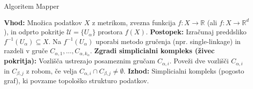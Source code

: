 \begin{algorithm}
\caption{Algoritem Mapper}\label{alg:mapper}
\begin{algorithmic}[1]
\State \textbf{Vhod:} Množica podatkov $X$ z metrikom, 
    zvezna funkcija $f: X \rightarrow \mathbb{R}$ (ali $f: X \rightarrow \mathbb{R}^d$), 
    in odprto pokritje $\mathcal{U} = \{U_\alpha\}$ prostora $f(X)$.
\State \textbf{Postopek:}
    \State Izračunaj preddsliko $f^{-1}(U_\alpha) \subseteq X$.
    \State Na $f^{-1}(U_\alpha)$ uporabi metodo gručenja (npr. single-linkage) in razdeli v gruče $C_{\alpha,1}, \ldots, C_{\alpha,k_\alpha}$.
\EndFor
\State \textbf{Zgradi simplicialni kompleks (živec pokritja):}
\State \quad Vozlišča ustrezajo posameznim gručam $C_{\alpha,i}$.
\State \quad Poveži dve vozlišči $C_{\alpha,i}$ in $C_{\beta,j}$ z robom, če velja $C_{\alpha,i} \cap C_{\beta,j} \neq \emptyset$.
\State \textbf{Izhod:} Simplicialni kompleks (pogosto graf), ki povzame topološko strukturo podatkov.
\end{algorithmic}
\end{algorithm}